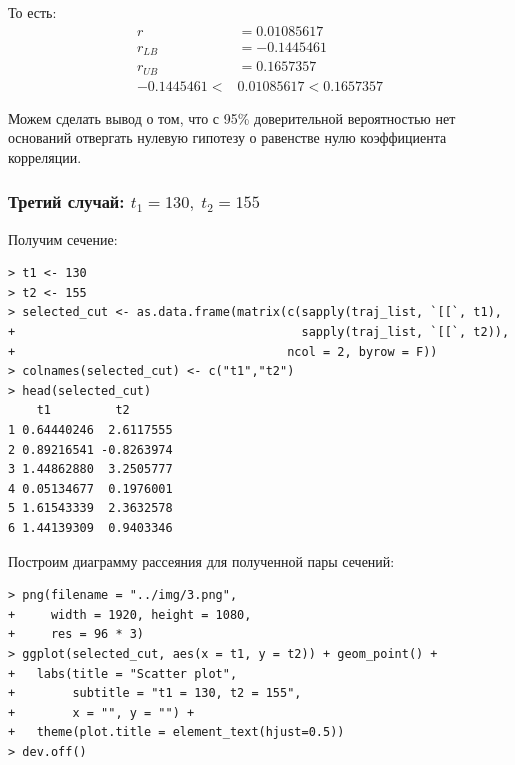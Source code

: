 \documentclass[14pt,a4paper]{scrartcl}
\begin{document}
То есть:
\begin{align*}
	r &= 0.01085617 \\
	r_{LB} &= -0.1445461\\
	r_{UB} &= 0.1657357\\
	-0.1445461 < &0.01085617 < 0.1657357
\end{align*}

Можем сделать вывод о том, что с 95\% доверительной вероятностью нет оснований отвергать нулевую гипотезу о равенстве нулю коэффициента корреляции.
\pagebreak
\subsubsection*{Третий случай: $t_1 = 130, \; t_2 = 155$}
Получим сечение:

\begin{verbatim}
> t1 <- 130
> t2 <- 155
> selected_cut <- as.data.frame(matrix(c(sapply(traj_list, `[[`, t1),
+                                        sapply(traj_list, `[[`, t2)),
+                                      ncol = 2, byrow = F))
> colnames(selected_cut) <- c("t1","t2")
> head(selected_cut)
	t1         t2
1 0.64440246  2.6117555
2 0.89216541 -0.8263974
3 1.44862880  3.2505777
4 0.05134677  0.1976001
5 1.61543339  2.3632578
6 1.44139309  0.9403346
\end{verbatim}

Построим диаграмму рассеяния для полученной пары сечений:

\begin{verbatim}
> png(filename = "../img/3.png",
+     width = 1920, height = 1080,
+     res = 96 * 3)
> ggplot(selected_cut, aes(x = t1, y = t2)) + geom_point() +
+   labs(title = "Scatter plot",
+        subtitle = "t1 = 130, t2 = 155",
+        x = "", y = "") + 
+   theme(plot.title = element_text(hjust=0.5))
> dev.off()
\end{verbatim}

\begin{figure}[H]
	\begin{minipage}[h]{1\linewidth}
		  \\
	\end{minipage}
\end{figure}
\end{document}
